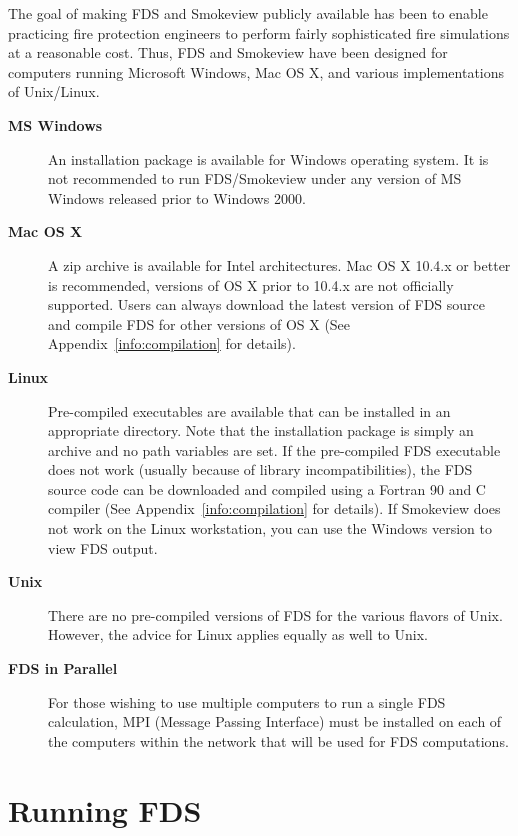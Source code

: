 \documentclass[11pt]{book}
\begin{document}
The goal of making FDS and Smokeview publicly available has been to enable
practicing fire protection engineers to perform fairly sophisticated
fire simulations at a reasonable cost. Thus, FDS and Smokeview have been
designed for computers running Microsoft Windows, Mac OS X, and various
implementations of Unix/Linux.

\begin{description}
\item[{\bf MS Windows}]
An installation package is available for Windows operating system.
It is not recommended to run FDS/Smokeview under any version of MS Windows
released prior to Windows 2000.

\item[{\bf Mac OS X}]
A zip archive is available for Intel architectures.
Mac OS X 10.4.x or better is recommended, versions of OS X prior to 10.4.x are not
officially supported. Users can always download the latest version of FDS source and
compile FDS for other versions of OS X (See Appendix~\ref{info:compilation} for details).

\item[{\bf Linux}]
Pre-compiled executables are available that can be installed in an appropriate directory. Note that
the installation package is simply an archive and no path variables are set. If the pre-compiled
FDS executable does not work (usually because of library incompatibilities),
the FDS source code can be downloaded and compiled using a Fortran 90 and
C compiler (See Appendix~\ref{info:compilation} for details). If Smokeview
does not work on the Linux workstation, you can use the Windows version to view FDS output.

\item[{\bf Unix}]
There are no pre-compiled versions of FDS for the various flavors of Unix. However, the advice for Linux applies
equally as well to Unix.

\item[{\bf FDS in Parallel}] For those wishing to use multiple computers to run a single FDS calculation,
MPI (Message Passing Interface) must be installed on each of the
computers within the network that will be used for FDS computations.
\end{description}



\chapter{Running FDS}
\label{info:runningFDS}
\end{document}
